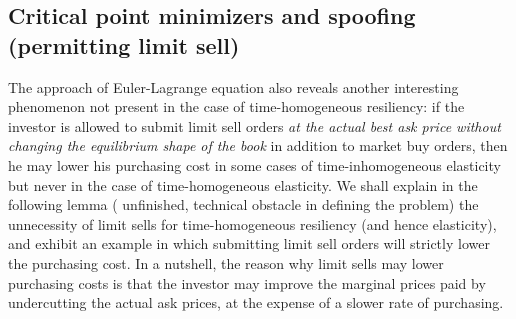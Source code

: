 \documentclass[openany,oneside]{article}
\theoremstyle{definition}
\theoremstyle{remark}
\begin{document}
\subsection{Critical point minimizers and spoofing (permitting limit sell)}
The approach of Euler-Lagrange equation also reveals another interesting phenomenon not present in the case of time-homogeneous resiliency: if the investor is allowed to submit limit sell orders \emph{at the actual best ask price without changing the equilibrium shape of the book} in addition to market buy orders, then he may lower his purchasing cost in some cases of time-inhomogeneous elasticity but never in the case of time-homogeneous elasticity. We shall explain in the following lemma ({\color{red} unfinished, technical obstacle in defining the problem}) the unnecessity of limit sells for time-homogeneous resiliency (and hence elasticity), and exhibit an example in which submitting limit sell orders will strictly lower the purchasing cost. In a nutshell, the reason why limit sells may lower purchasing costs is that the investor may improve the marginal prices paid by undercutting the actual ask prices, at the expense of a slower rate of purchasing.
\end{document}

